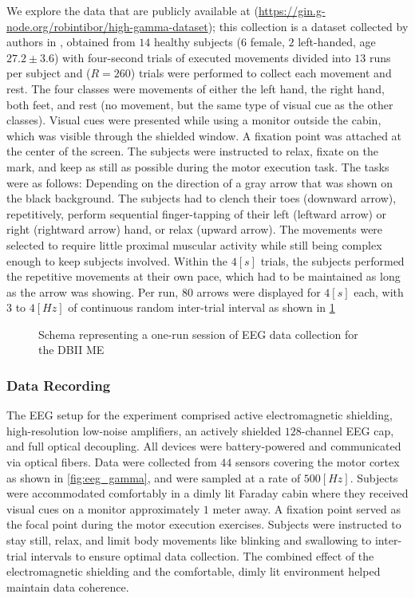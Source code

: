 We explore the data that are publicly available at (\url{https://gin.g-node.org/robintibor/high-gamma-dataset}); this collection is a dataset collected by authors in \cite{schirrmeister2017deep}, obtained from $14$ healthy subjects ($6$ female, $2$ left-handed, age $27.2\pm 3.6$) with four-second trials of executed movements divided into $13$ runs per subject and ($R = 260$) trials were performed to collect each movement and rest. The four classes were movements of either the left hand, the right hand, both feet, and rest (no movement, but the same type of visual cue as the other classes). Visual cues were presented while using a monitor outside the cabin, which was visible through the shielded window. A fixation point was attached at the center of the screen. The subjects were instructed to relax, fixate on the mark, and keep as still as possible during the motor execution task. The tasks were as follows: Depending on the direction of a gray arrow that was shown on the black background. The subjects had to clench their toes (downward arrow), repetitively, perform sequential finger-tapping of their left (leftward arrow) or right (rightward arrow) hand, or relax (upward arrow). The movements were selected to require little proximal muscular activity while still being complex enough to keep subjects involved. Within the $4[s]$ trials, the subjects performed the repetitive movements at their own pace, which had to be maintained as long as the arrow was showing. Per run, $80$ arrows were displayed for $4[s]$ each, with $3$ to $4[Hz]$ of continuous random inter-trial interval as shown in \cref{fig:gamma_time}

\begin{figure}[h!]
\centering
    \resizebox{1.0\linewidth}{!}{}
    \caption{Schema representing a one-run session of EEG data collection for the DBII ME
    \label{fig:gamma_time}}
\end{figure}

\subsubsection{Data Recording}

The EEG setup for the experiment comprised active electromagnetic shielding, high-resolution low-noise amplifiers, an actively shielded $128$-channel EEG cap, and full optical decoupling. All devices were battery-powered and communicated via optical fibers. Data were collected from $44$ sensors covering the motor cortex as shown in \cref{fig:eeg_gamma}, and were sampled at a rate of $500[Hz]$. Subjects were accommodated comfortably in a dimly lit Faraday cabin where they received visual cues on a monitor approximately $1$ meter away. A fixation point served as the focal point during the motor execution exercises. Subjects were instructed to stay still, relax, and limit body movements like blinking and swallowing to inter-trial intervals to ensure optimal data collection. The combined effect of the electromagnetic shielding and the comfortable, dimly lit environment helped maintain data coherence.


